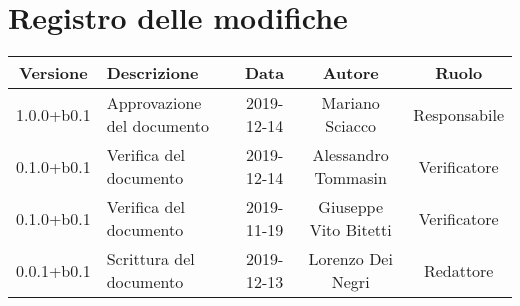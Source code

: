 \section*{Registro delle modifiche}

\begin{center}
	\begin{longtable}{|c|p{3cm}|c|c|c|}
	\hline
	\rowcolor{lighter-grayer}
	\textbf{Versione} & \textbf{Descrizione} & \textbf{Data} & \textbf{Autore} & \textbf{Ruolo} \\
	\hline
	\endfirsthead



	1.0.0+b0.1 & Approvazione del documento & 2019-12-14 & Mariano Sciacco & Responsabile \\
	\hline
	0.1.0+b0.1 & Verifica del documento & 2019-12-14 & Alessandro Tommasin & Verificatore \\
	\hline
	0.1.0+b0.1 & Verifica del documento & 2019-11-19 & Giuseppe Vito Bitetti & Verificatore \\
	\hline
	0.0.1+b0.1 & Scrittura del documento & 2019-12-13 & Lorenzo Dei Negri & Redattore \\
	\hline

	\end{longtable}
\end{center}

